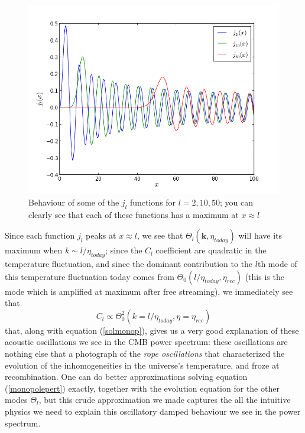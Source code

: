 \documentclass[11pt, a4paper,oneside,openright]{book}
\numberwithin{equation}{section}
\begin{document}
\begin{figure}
\begin{center}
\includegraphics[scale=0.7]{Fourier/bessel.png}
\end{center}
\caption{Behaviour of some of the $j_l$ functions for $l=2,10,50$; you can clearly see that each of these functions has a maximum at $x\approx l$}
\label{bess}
\end{figure}
Since each function $j_l$ peaks at $x\approx l$, we see that $\Theta_l(\mathbf{k},\eta_{today})$ will have its maximum when $k\sim l/\eta_{today}$; since the $C_l$ coefficient are quadratic in the temperature fluctuation, and since the dominant contribution to the $l$th mode of this temperature fluctuation today comes from $\Theta_0(l/\eta_{today},\eta_{rec})$ (this is the mode which is amplified at maximum after free streaming), we immediately see that 
\begin{equation}
C_l\propto \Theta_0^2(k=l/\eta_{today},\eta=\eta_{rec})
\end{equation}
that, along with equation (\ref{solmonop}), gives us a very good explanation of these acoustic oscillations we see in the CMB power spectrum: these oscillations are nothing else that a photograph of the \textit{rope oscillations} that characterized the evolution of the inhomogeneities in the universe's temperature, and froze at recombination. One can do better approximations solving equation (\ref{monopolepert}) exactly, together with the evolution equation for the other modes $\Theta_l$, but this crude approximation we made captures the all the intuitive physics we need to explain this oscillatory damped behaviour we see in the power spectrum. 
\end{document}
